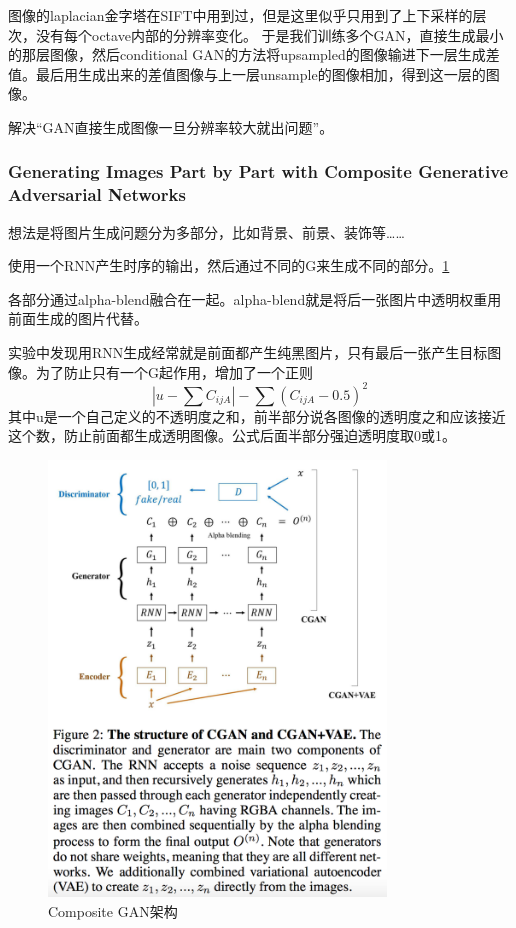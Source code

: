 \documentclass[a4paper]{article}
\begin{document}
图像的laplacian金字塔在SIFT中用到过，但是这里似乎只用到了上下采样的层次，没有每个octave内部的分辨率变化。
于是我们训练多个GAN，直接生成最小的那层图像，然后conditional GAN的方法将upsampled的图像输进下一层生成差值。最后用生成出来的差值图像与上一层unsample的图像相加，得到这一层的图像。

解决“GAN直接生成图像一旦分辨率较大就出问题”。
\subsubsection{Generating Images Part by Part with Composite Generative Adversarial Networks\cite{DBLP:journals/corr/KwakZ16}}
想法是将图片生成问题分为多部分，比如背景、前景、装饰等……

使用一个RNN产生时序的输出，然后通过不同的G来生成不同的部分。\ref{fig:21}

各部分通过alpha-blend融合在一起。alpha-blend就是将后一张图片中透明权重用前面生成的图片代替。

实验中发现用RNN生成经常就是前面都产生纯黑图片，只有最后一张产生目标图像。为了防止只有一个G起作用，增加了一个正则
$$|u - \sum C_{ijA}|-\sum (C_{ijA}-0.5)^2$$
其中u是一个自己定义的不透明度之和，前半部分说各图像的透明度之和应该接近这个数，防止前面都生成透明图像。公式后面半部分强迫透明度取0或1。
\begin{figure}
\centering
\includegraphics[width=0.8\textwidth]{./img/21.png}
\caption{Composite GAN架构}
\label{fig:21}
\end{figure}
\end{document}

